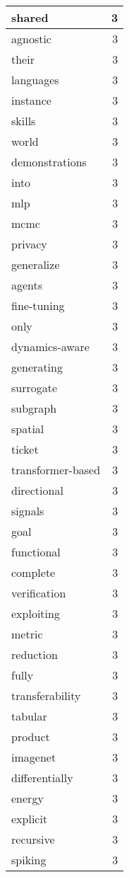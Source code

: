 \begin{table}[h]
\begin{tabular}{|l|r|}
shared & 3 \\
\hline
agnostic & 3 \\
\hline
their & 3 \\
\hline
languages & 3 \\
\hline
instance & 3 \\
\hline
skills & 3 \\
\hline
world & 3 \\
\hline
demonstrations & 3 \\
\hline
into & 3 \\
\hline
mlp & 3 \\
\hline
mcmc & 3 \\
\hline
privacy & 3 \\
\hline
generalize & 3 \\
\hline
agents & 3 \\
\hline
fine-tuning & 3 \\
\hline
only & 3 \\
\hline
dynamics-aware & 3 \\
\hline
generating & 3 \\
\hline
surrogate & 3 \\
\hline
subgraph & 3 \\
\hline
spatial & 3 \\
\hline
ticket & 3 \\
\hline
transformer-based & 3 \\
\hline
directional & 3 \\
\hline
signals & 3 \\
\hline
goal & 3 \\
\hline
functional & 3 \\
\hline
complete & 3 \\
\hline
verification & 3 \\
\hline
exploiting & 3 \\
\hline
metric & 3 \\
\hline
reduction & 3 \\
\hline
fully & 3 \\
\hline
transferability & 3 \\
\hline
tabular & 3 \\
\hline
product & 3 \\
\hline
imagenet & 3 \\
\hline
differentially & 3 \\
\hline
energy & 3 \\
\hline
explicit & 3 \\
\hline
recursive & 3 \\
\hline
spiking & 3 \\

\end{tabular}
\end{table}
